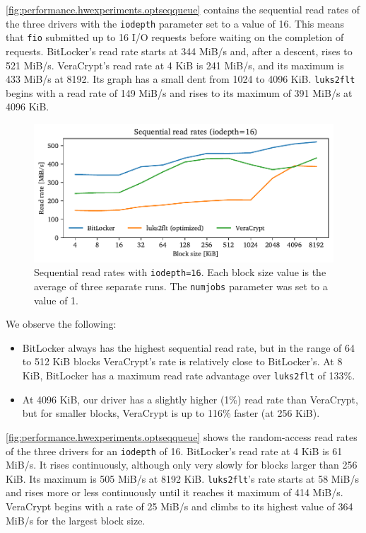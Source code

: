 \autoref{fig:performance.hwexperiments.optseqqueue} contains the sequential read rates of the three drivers with the \texttt{iodepth} parameter set to a value of 16. This means that \texttt{fio} submitted up to 16 I/O requests before waiting on the completion of requests. BitLocker's read rate starts at 344 MiB/s and, after a descent, rises to 521 MiB/s. VeraCrypt's read rate at 4 KiB is 241 MiB/s, and its maximum is 433 MiB/s at 8192. Its graph has a small dent from 1024 to 4096 KiB. \texttt{luks2flt} begins with a read rate of 149 MiB/s and rises to its maximum of 391 MiB/s at 4096 KiB.

\begin{figure}[htb!]
	\center
	\includegraphics[scale=1]{../fig/performance.hwexperiments.optseqqueue.pdf}
	\caption[
		Sequential read rates with \texttt{iodepth=16}
	]{
		Sequential read rates with \texttt{iodepth=16}. Each block size value is the average of three separate runs. The \texttt{numjobs} parameter was set to a value of 1.
	}
	\label{fig:performance.hwexperiments.optseqqueue}
\end{figure}

We observe the following:
\begin{itemize}[beginpenalty=10000]
	\item BitLocker always has the highest sequential read rate, but in the range of 64 to 512 KiB blocks VeraCrypt's rate is relatively close to BitLocker's. At 8 KiB, BitLocker has a maximum read rate advantage over \texttt{luks2flt} of 133\%.
	\item At 4096 KiB, our driver has a slightly higher (1\%) read rate than VeraCrypt, but for smaller blocks, VeraCrypt is up to 116\% faster (at 256 KiB).
\end{itemize}

\autoref{fig:performance.hwexperiments.optseqqueue} shows the random-access read rates of the three drivers for an \texttt{iodepth} of 16. BitLocker's read rate at 4 KiB is 61 MiB/s. It rises continuously, although only very slowly for blocks larger than 256 KiB. Its maximum is 505 MiB/s at 8192 KiB. \texttt{luks2flt}'s rate starts at 58 MiB/s and rises more or less continuously until it reaches it maximum of 414 MiB/s. VeraCrypt begins with a rate of 25 MiB/s and climbs to its highest value of 364 MiB/s for the largest block size.


